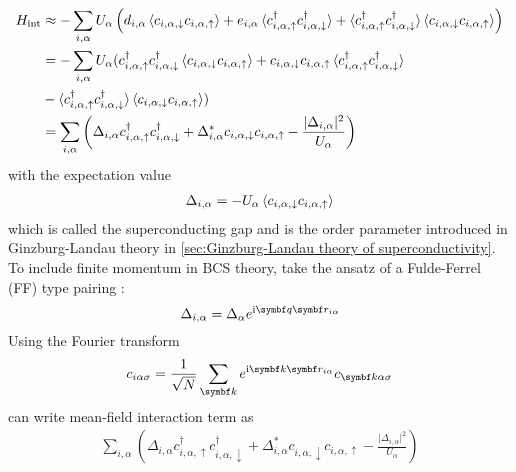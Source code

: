 \documentclass[../notes.tex]{subfiles}
\begin{document}
\begin{align}
	H_{\mathrm{int}} &\approx -\sum_{i, \alpha} U_{\alpha} \left(
	d_{i, \alpha} \braket{c_{i, \alpha, \downarrow} c_{i, \alpha, \uparrow}}
	+ e_{i, \alpha} \braket{c_{i, \alpha, \uparrow}^{\dagger} c_{i, \alpha, \downarrow}^{\dagger}}
	+ \braket{c_{i, \alpha, \uparrow}^{\dagger} c_{i, \alpha, \downarrow}^{\dagger}} \braket{c_{i, \alpha, \downarrow} c_{i, \alpha, \uparrow}}
	\right) \\
	&= -\sum_{i, \alpha} U_{\alpha} (
		c_{i, \alpha, \uparrow}^{\dagger} c_{i, \alpha, \downarrow}^{\dagger} \braket{c_{i, \alpha, \downarrow} c_{i, \alpha, \uparrow}}
		+ c_{i, \alpha, \downarrow} c_{i, \alpha, \uparrow} \braket{c_{i, \alpha, \uparrow}^{\dagger} c_{i, \alpha, \downarrow}^{\dagger}} \\	
	&- \braket{c_{i, \alpha, \uparrow}^{\dagger} c_{i, \alpha, \downarrow}^{\dagger}} \braket{c_{i, \alpha, \downarrow} c_{i, \alpha, \uparrow}} ) \\
	&= \sum_{i, \alpha} \left(\Delta_{i, \alpha} c_{i, \alpha, \uparrow}^{\dagger} c_{i, \alpha, \downarrow}^{\dagger} + \Delta_{i, \alpha}^{*} c_{i, \alpha, \downarrow} c_{i, \alpha, \uparrow} - \frac{\vert \Delta_{i, \alpha} \vert^2}{U_{\alpha}}\right)
\end{align}
with the expectation value
\begin{align}
	\Delta_{i, \alpha} = -U_{\alpha} \braket{c_{i, \alpha, \downarrow} c_{i, \alpha, \uparrow}}
\end{align}
which is called the superconducting gap and is the order parameter introduced in Ginzburg-Landau theory in \cref{sec:Ginzburg-Landau theory of superconductivity}.
To include finite momentum in BCS theory, take the ansatz of a Fulde-Ferrel (FF) type pairing \cite{kinnunenFuldeFerrellLarkin2018}:  
\begin{equation}
	\Delta_{i, \alpha} = \Delta_{\alpha} e^{\iu \vb{q} \vb{r}_{i \alpha}}
\end{equation}
Using the Fourier transform
\begin{equation}
	c_{i \alpha \sigma} = \frac{1}{\sqrt{N}} \sum_{\vb{k}} e^{\iu \vb{k} \vb{r}_{i \alpha}} c_{\vb{k} \alpha \sigma}
\end{equation}
can write mean-field interaction term as
\begin{align}
	\sum_{i, \alpha} \left(\Delta_{i, \alpha} c_{i, \alpha, \uparrow}^{\dagger} c_{i, \alpha, \downarrow}^{\dagger} + \Delta_{i, \alpha}^{*} c_{i, \alpha, \downarrow} c_{i, \alpha, \uparrow} - \frac{\vert \Delta_{i, \alpha} \vert^2}{U_{\alpha}}\right)
\end{align}
\end{document}
